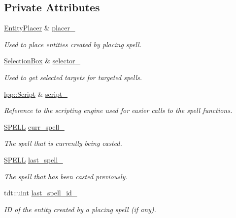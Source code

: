 \subsection*{Private Attributes}
\begin{DoxyCompactItemize}
\item 
\hyperlink{class_entity_placer}{Entity\+Placer} \& \hyperlink{class_spellcaster_afc71d4b4359263bbe6b5097ffdf2213d}{placer\+\_\+}
\begin{DoxyCompactList}\small\item\em Used to place entities created by placing spell. \end{DoxyCompactList}\item 
\hyperlink{class_selection_box}{Selection\+Box} \& \hyperlink{class_spellcaster_af3aeccdb061ff26b308d3147d1fb8e4f}{selector\+\_\+}
\begin{DoxyCompactList}\small\item\em Used to get selected targets for targeted spells. \end{DoxyCompactList}\item 
\hyperlink{classlpp_1_1_script}{lpp\+::\+Script} \& \hyperlink{class_spellcaster_a7eb799aff1aff16e7eb5c319eaf1bb1c}{script\+\_\+}
\begin{DoxyCompactList}\small\item\em Reference to the scripting engine used for easier calls to the spell functions. \end{DoxyCompactList}\item 
\hyperlink{struct_spellcaster_1_1_s_p_e_l_l}{S\+P\+E\+LL} \hyperlink{class_spellcaster_a976dd2761e2db139d150e8b90283a89f}{curr\+\_\+spell\+\_\+}
\begin{DoxyCompactList}\small\item\em The spell that is currently being casted. \end{DoxyCompactList}\item 
\hyperlink{struct_spellcaster_1_1_s_p_e_l_l}{S\+P\+E\+LL} \hyperlink{class_spellcaster_a397320efd8c657b8e47694124ba45fd1}{last\+\_\+spell\+\_\+}
\begin{DoxyCompactList}\small\item\em The spell that has been casted previously. \end{DoxyCompactList}\item 
tdt\+::uint \hyperlink{class_spellcaster_a396c7fb9dfcf6d20086f47944e637e6f}{last\+\_\+spell\+\_\+id\+\_\+}
\begin{DoxyCompactList}\small\item\em ID of the entity created by a placing spell (if any). \end{DoxyCompactList}\end{DoxyCompactItemize}


